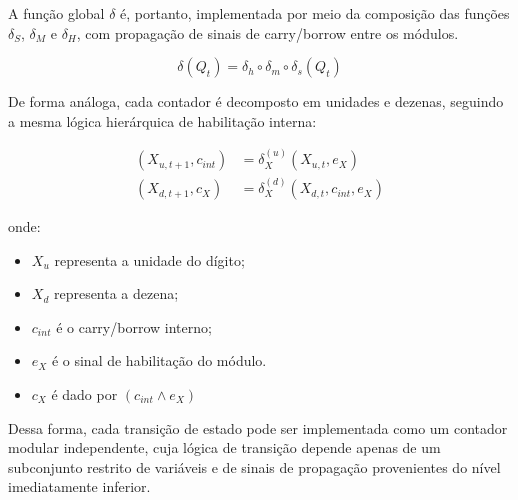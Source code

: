 A função global $\delta$ é, portanto, implementada por meio da composição das funções $\delta_S$, $\delta_M$ e $\delta_H$, com propagação de sinais de carry/borrow entre os módulos.

\[
\delta(Q_t) = \delta_h \circ \delta_m \circ \delta_s (Q_t)
\]

De forma análoga, cada contador é decomposto em unidades e dezenas, seguindo a mesma lógica hierárquica de habilitação interna:

\begin{align*}
(X_{u,t+1}, c_{int}) &= \delta_X^{(u)}(X_{u,t}, e_X) \\
(X_{d,t+1}, c_X) &= \delta_X^{(d)}(X_{d,t}, c_{int}, e_X)
\end{align*}

onde:
\begin{itemize}
    \item $X_u$ representa a unidade do dígito;
    \item $X_d$ representa a dezena;
    \item $c_{int}$ é o carry/borrow interno;
    \item $e_X$ é o sinal de habilitação do módulo.
    \item $c_X$ é dado por $(c_{int} \land e_X)$
\end{itemize}

Dessa forma, cada transição de estado pode ser implementada como um contador modular independente, cuja lógica de transição depende apenas de um subconjunto restrito de variáveis e de sinais de propagação provenientes do nível imediatamente inferior.